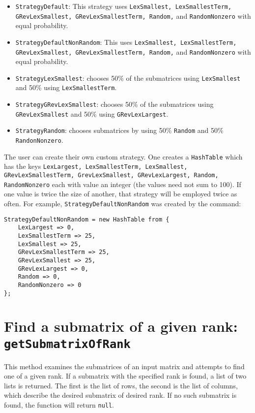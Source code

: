 \documentclass[11pt]{amsart}
\begin{document}
\begin{itemize}
  \item {\tt StrategyDefault}: This strategy uses  
  {\tt LexSmallest, LexSmallestTerm, GRevLexSmallest, GRevLexSmallestTerm, Random,} and {\tt RandomNonzero} with equal probability.
  \item {\tt StrategyDefaultNonRandom}: This uses  
  {\tt LexSmallest, LexSmallestTerm, GRevLexSmallest, GRevLexSmallestTerm, Random,} and {\tt RandomNonzero} with equal probability.
  \item {\tt StrategyLexSmallest}: chooses 50\% of the submatrices using {\tt LexSmallest} and 50\% 
  using {\tt LexSmallestTerm}.
  \item {\tt StrategyGRevLexSmallest}: chooses 50\% of the submatrices using {\tt GRevLexSmallest} 
  and 50\% using {\tt GRevLexLargest}.
  \item {\tt StrategyRandom}: chooses submatrices by using 50\% {\tt Random} and 50\% {\tt RandonNonzero}.
  \end{itemize}  

The user can create their own custom strategy.  One creates a {\tt HashTable} which has the keys 
{\tt LexLargest, LexSmallestTerm, LexSmallest, GRevLexSmallestTerm, GrevLexSmallest, GRevLexLargest, Random, RandomNonzero} each with value an integer (the values need not sum to 100).  If one value is twice the size of another, that strategy will be employed twice as often.  For example, {\tt StrategyDefaultNonRandom} was created by the command:

{{\small\color{blue}
\begin{verbatim}
StrategyDefaultNonRandom = new HashTable from {
    LexLargest => 0,
    LexSmallestTerm => 25,
    LexSmallest => 25,
    GRevLexSmallestTerm => 25,
    GRevLexSmallest => 25,
    GRevLexLargest => 0,
    Random => 0,
    RandomNonzero => 0
};
\end{verbatim}}
}
\section{Find a submatrix of a given rank: {\tt getSubmatrixOfRank}}
\label{sec.GetSubmatrixOfRank}

This method examines the submatrices of an input matrix and attempts to find one of a 
given rank. If a submatrix with the specified rank is found, a list of two lists is returned. 
The first is the list of rows, the second is the list of columns, which describe the desired submatrix of desired rank. 
If no such submatrix is found, the function will return {\tt null}. 
\end{document}
